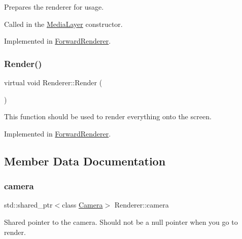 Prepares the renderer for usage. 

Called in the \hyperlink{class_media_layer}{Media\+Layer} constructor. 

Implemented in \hyperlink{class_forward_renderer_a5cbca647822780d6cfbd39552d73ee06}{Forward\+Renderer}.

\hypertarget{class_renderer_a38623da22aa718cfa41e2514ebd269f5}{}\label{class_renderer_a38623da22aa718cfa41e2514ebd269f5} 
\subsubsection{\texorpdfstring{Render()}{Render()}}
{\footnotesize\ttfamily virtual void Renderer\+::\+Render (\begin{DoxyParamCaption}{ }\end{DoxyParamCaption})\hspace{0.3cm}{\ttfamily [pure virtual]}}



This function should be used to render everything onto the screen. 



Implemented in \hyperlink{class_forward_renderer_a1a5deafa5deaf1e0abaab0e2074928c1}{Forward\+Renderer}.



\subsection{Member Data Documentation}
\hypertarget{class_renderer_a7a08c6489c1ffe8e346b9f205b4014ca}{}\label{class_renderer_a7a08c6489c1ffe8e346b9f205b4014ca} 
\subsubsection{\texorpdfstring{camera}{camera}}
{\footnotesize\ttfamily std\+::shared\+\_\+ptr$<$class \hyperlink{class_camera}{Camera}$>$ Renderer\+::camera\hspace{0.3cm}{\ttfamily [protected]}}



Shared pointer to the camera. Should not be a null pointer when you go to render. 

\hypertarget{class_renderer_a65178695d48824d3afd6fe40fd4915b6}{}\label{class_renderer_a65178695d48824d3afd6fe40fd4915b6} 
